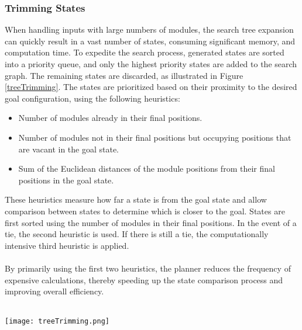 \subsubsection{Trimming States}
When handling inputs with large numbers of modules, the search tree expansion can quickly result in a vast number of states, consuming significant memory, and computation time. To expedite the search process, generated states are sorted into a priority queue, and only the highest priority states are added to the search graph. The remaining states are discarded, as illustrated in Figure \ref{treeTrimming}. The states are prioritized based on their proximity to the desired goal configuration, using the following heuristics:
\begin{itemize}[]
	\item Number of modules already in their final positions.
	\item Number of modules not in their final positions but occupying positions that are vacant in the goal state.
	\item Sum of the Euclidean distances of the module positions from their final positions in the goal state.
\end{itemize}
These heuristics measure how far a state is from the goal state and allow comparison between states to determine which is closer to the goal. States are first sorted using the number of modules in their final positions. In the event of a tie, the second heuristic is used. If there is still a tie, the computationally intensive third heuristic is applied.
\\\\
By primarily using the first two heuristics, the planner reduces the frequency of expensive calculations, thereby speeding up the state comparison process and improving overall efficiency.
\\\\
\begin{figure*}[h]
	\centering
	\texttt{[image: treeTrimming.png]}
	\caption{Selection of generated states demonstration}
	\label{treeTrimming}
\end{figure*}

